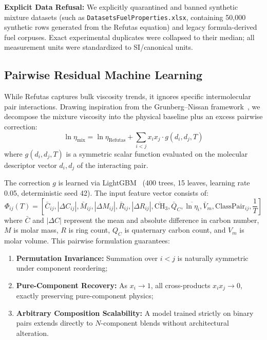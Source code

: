 \documentclass[11pt,a4paper]{article}
\begin{document}
\textbf{Explicit Data Refusal:} We explicitly quarantined and banned synthetic mixture datasets (such as \texttt{DatasetsFuelProperties.xlsx}, containing 50,000 synthetic rows generated from the Refutas equation) and legacy formula-derived fuel corpuses. Exact experimental duplicates were collapsed to their median; all measurement units were standardized to SI/canonical units.

\subsection{Pairwise Residual Machine Learning}
While Refutas captures bulk viscosity trends, it ignores specific intermolecular pair interactions. Drawing inspiration from the Grunberg--Nissan framework~\cite{grunberg1949mixture}, we decompose the mixture viscosity into the physical baseline plus an excess pairwise correction:
\begin{equation}
    \ln \eta_{\text{mix}} = \ln \eta_{\text{Refutas}} + \sum_{i < j} x_i x_j \cdot g(d_i, d_j, T)
    \label{eq:visc_pair}
\end{equation}
where $g(d_i, d_j, T)$ is a symmetric scalar function evaluated on the molecular descriptor vector $d_i, d_j$ of the interacting pair. 

The correction $g$ is learned via LightGBM~\cite{ke2017lightgbm} (400 trees, 15 leaves, learning rate 0.05, deterministic seed 42). The input feature vector consists of:
\begin{equation}
    \Phi_{ij}(T) = \left[ \bar{C}_{ij}, |\Delta C_{ij}|, \bar{M}_{ij}, |\Delta M_{ij}|, \bar{R}_{ij}, |\Delta R_{ij}|, \overline{\text{CH}}_3, \bar{Q}_C, \overline{\ln \eta_i}, \bar{V}_{m}, \text{ClassPair}_{ij}, \frac{1}{T} \right]
\end{equation}
where $\bar{C}$ and $|\Delta C|$ represent the mean and absolute difference in carbon number, $M$ is molar mass, $R$ is ring count, $Q_C$ is quaternary carbon count, and $V_m$ is molar volume. This pairwise formulation guarantees:
\begin{enumerate}
    \item \textbf{Permutation Invariance:} Summation over $i < j$ is naturally symmetric under component reordering;
    \item \textbf{Pure-Component Recovery:} As $x_i \to 1$, all cross-products $x_i x_j \to 0$, exactly preserving pure-component physics;
    \item \textbf{Arbitrary Composition Scalability:} A model trained strictly on binary pairs extends directly to $N$-component blends without architectural alteration.
\end{enumerate}
\end{document}
